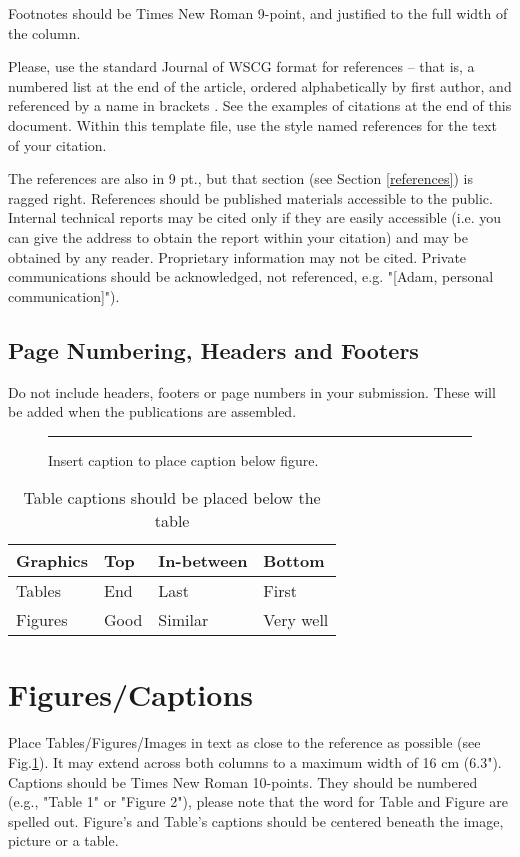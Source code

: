 \documentclass[twoside,twocolumn,10pt]{article}
\begin{document}
Footnotes should be Times New Roman 9-point, and justified to the full width of the column.

Please, use the standard Journal of WSCG format for references -- that is, a numbered list at the end of the article, ordered alphabetically by first author, and referenced by a name in brackets \cite{con00a}. See the examples of citations at the end of this document. Within this template file, use the style named references for the text of your citation.

The references are also in 9 pt., but that section (see Section \ref{references}) is ragged right. References should be published materials accessible to the public. Internal technical reports may be cited only if they are easily accessible (i.e. you can give the address to obtain the report within your citation) and may be obtained by any reader. Proprietary information may not be cited. Private communications should be acknowledged, not referenced, e.g. "[Adam, personal communication]").

\subsection*{Page Numbering, Headers and Footers}
Do not include headers, footers or page numbers in your submission. These will be added when the publications are assembled.

\begin{figure}[htb]
    \centering
    \rule{6cm}{3cm}
    \caption{Insert caption to place caption below figure.}
    \label{fig:box}
\end{figure}

\begin{table}[htb]
	\centering
	\begin{tabular}{|l|l|l|l|}
	\hline
	Graphics & Top & In-between & Bottom \\
	\hline
	Tables & End & Last & First \\
	\hline
	Figures & Good & Similar & Very well \\
	\hline
	\end{tabular}
	\caption{Table captions should be placed below the table}
\end{table}

\section{Figures/Captions}
Place Tables/Figures/Images in text as close to the reference as possible (see Fig.\ref{fig:box}). It may extend across both columns to a maximum width of 16 cm (6.3"). Captions should be Times New Roman 10-points.  They should be numbered (e.g., "Table 1" or "Figure 2"), please note that the word for Table and Figure are spelled out. Figure's and Table's captions should be centered beneath the image, picture or a table.
\end{document}
